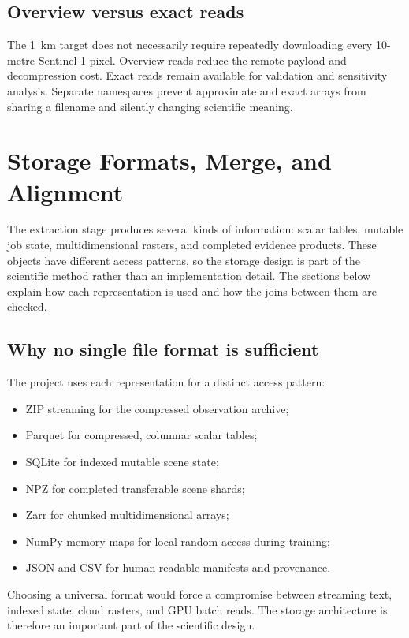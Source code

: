 \documentclass[12pt,a4paper]{report}
\begin{document}
\subsection{Overview versus exact reads}
The 1~km target does not necessarily require repeatedly downloading every
10-metre Sentinel-1 pixel. Overview reads reduce the remote payload and
decompression cost. Exact reads remain available for validation and sensitivity
analysis. Separate namespaces prevent approximate and exact arrays from sharing
a filename and silently changing scientific meaning.

\section{Storage Formats, Merge, and Alignment}

The extraction stage produces several kinds of information: scalar tables,
mutable job state, multidimensional rasters, and completed evidence products.
These objects have different access patterns, so the storage design is part of
the scientific method rather than an implementation detail. The sections below
explain how each representation is used and how the joins between them are
checked.

\subsection{Why no single file format is sufficient}
The project uses each representation for a distinct access pattern:
\begin{itemize}
    \item ZIP streaming for the compressed observation archive;
    \item Parquet for compressed, columnar scalar tables;
    \item SQLite for indexed mutable scene state;
    \item NPZ for completed transferable scene shards;
    \item Zarr for chunked multidimensional arrays;
    \item NumPy memory maps for local random access during training;
    \item JSON and CSV for human-readable manifests and provenance.
\end{itemize}

Choosing a universal format would force a compromise between streaming text,
indexed state, cloud rasters, and GPU batch reads. The storage architecture is
therefore an important part of the scientific design.
\end{document}
